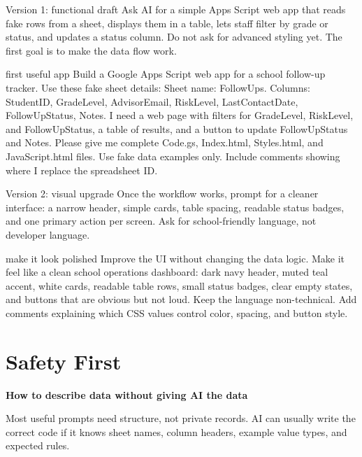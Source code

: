 \documentclass[10pt]{article}
\newcommand{\sectionkicker}[1]{\vspace{0.2em}{\small\bfseries\color{GCTeal}#1}\vspace{-0.15em}}
\newcommand{\tighttitle}[1]{{\Large\bfseries\color{GCNavy}#1}\par}
\begin{document}
\begin{textbox}{Version 1: functional draft}
Ask AI for a simple Apps Script web app that reads fake rows from a sheet, displays them in a table, lets staff filter by grade or status, and updates a status column. Do not ask for advanced styling yet. The first goal is to make the data flow work.
\end{textbox}

\begin{promptbox}{first useful app}
Build a Google Apps Script web app for a school follow-up tracker. Use these fake sheet details: Sheet name: FollowUps. Columns: StudentID, GradeLevel, AdvisorEmail, RiskLevel, LastContactDate, FollowUpStatus, Notes. I need a web page with filters for GradeLevel, RiskLevel, and FollowUpStatus, a table of results, and a button to update FollowUpStatus and Notes. Please give me complete Code.gs, Index.html, Styles.html, and JavaScript.html files. Use fake data examples only. Include comments showing where I replace the spreadsheet ID.
\end{promptbox}

\begin{textbox}{Version 2: visual upgrade}
Once the workflow works, prompt for a cleaner interface: a narrow header, simple cards, table spacing, readable status badges, and one primary action per screen. Ask for school-friendly language, not developer language.
\end{textbox}

\begin{promptbox}{make it look polished}
Improve the UI without changing the data logic. Make it feel like a clean school operations dashboard: dark navy header, muted teal accent, white cards, readable table rows, small status badges, clear empty states, and buttons that are obvious but not loud. Keep the language non-technical. Add comments explaining which CSS values control color, spacing, and button style.
\end{promptbox}

\section{Safety First}
\sectionkicker{PROTECT THE DATA BEFORE THE DESIGN}
\tighttitle{How to describe data without giving AI the data}

Most useful prompts need structure, not private records. AI can usually write the correct code if it knows sheet names, column headers, example value types, and expected rules.
\end{document}
